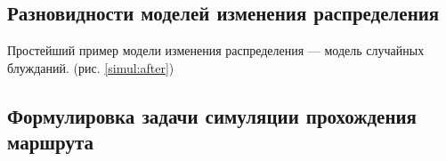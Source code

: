 \subsection{Разновидности моделей изменения распределения}
Простейший пример модели изменения распределения --- модель случайных блужданий.
(рис. \ref{simul:after})
\FloatBarrier
\subsection{Формулировка задачи симуляции прохождения маршрута}
\FloatBarrier
